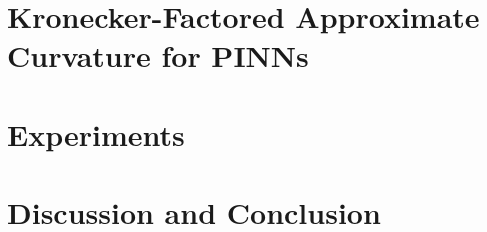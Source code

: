 \documentclass{article}
\begin{document}
\section{Kronecker-Factored Approximate Curvature for
PINNs}\label{sec:kfac_pinns}




\section{Experiments}\label{sec:experiments}



\section{Discussion and Conclusion}







\clearpage
\appendix




\end{document}
